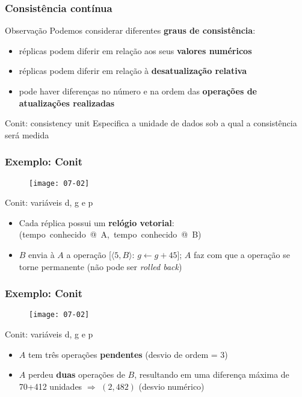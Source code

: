 \documentclass[Ligatures=TeX,table,brazil,svgnames,usetotalslideindicator,compress,10pt]{beamer}
\begin{document}
\begin{frame}
  \frametitle{Consistência contínua}
  \begin{block}{Observação}
    Podemos considerar diferentes \textbf{graus de consistência}:
    \begin{itemize}
    \item réplicas podem diferir em relação aos seus \textbf{valores numéricos}
    \item réplicas podem diferir em relação à \textbf{desatualização relativa}
    \item pode haver diferenças no número e na ordem das \textbf{operações de atualizações realizadas}
    \end{itemize}
  \end{block}

  \begin{alertblock}{Conit: consistency unit}
    Especifica a \alert{unidade de dados} sob a qual a consistência será medida
  \end{alertblock}

\end{frame}

\begin{frame}
  \frametitle{Exemplo: Conit}
  \begin{figure}
    \centering
    \texttt{[image: 07-02]}
  \end{figure}
  \begin{block}{Conit: variáveis d, g e p}
    \begin{itemize}
    \item Cada réplica possui um \textbf{relógio vetorial}: \mbox{\alert{(tempo conhecido @ A, tempo conhecido @ B)}}
    \item $B$ envia à $A$ a operação [$\langle 5,B \rangle$: $g \leftarrow g + 45$]; $A$ faz com que a operação se torne \alert{permanente} (não pode ser \textit{rolled back})
    \end{itemize}
  \end{block}

\end{frame}

\begin{frame}
  \frametitle{Exemplo: Conit}
  \begin{figure}
    \centering
    \texttt{[image: 07-02]}
  \end{figure}
  \begin{block}{Conit: variáveis d, g e p}
    \begin{itemize}
      \item $A$ tem três operações \textbf{pendentes} (desvio de ordem = 3)
      \item $A$ perdeu \textbf{duas} operações de $B$, resultando em uma diferença máxima de 70+412 unidades $\Rightarrow$ $(2,482)$ (desvio numérico)
    \end{itemize}
  \end{block}

\end{frame}
\end{document}
